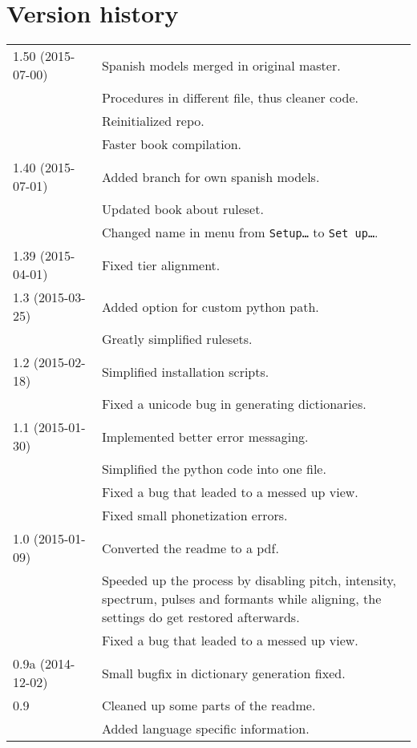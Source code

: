 \section{Version history}
\begin{longtable}{|p{0.22\linewidth}p{0.8\linewidth}|}
	\hline
	1.50 (2015-07-00) & \tabitem Spanish models merged in original master.\\
		& \tabitem Procedures in different file, thus cleaner code.\\
		& \tabitem Reinitialized repo.\\
		& \tabitem Faster book compilation.\\
	\hline
	1.40 (2015-07-01) & \tabitem  Added branch for own spanish models.\\
		& \tabitem Updated book about ruleset.\\
		& \tabitem Changed name in menu from \texttt{Setup\ldots} to 
			\texttt{Set up\dots}.\\
	\hline
	1.39 (2015-04-01) & \tabitem Fixed tier alignment.\\
	\hline
	1.3 (2015-03-25) & \tabitem Added option for custom python path.\\
	 & \tabitem Greatly simplified rulesets.\\
	\hline
	1.2 (2015-02-18) & \tabitem Simplified installation scripts.\\
		& \tabitem Fixed a unicode bug in generating dictionaries.\\
	\hline
	1.1 (2015-01-30) & \tabitem Implemented better error messaging.\\
		& \tabitem Simplified the python code into one file.\\
		& \tabitem Fixed a bug that leaded to a messed up view.\\
		& \tabitem Fixed small phonetization errors.\\
	\hline
	1.0 (2015-01-09) & \tabitem Converted the readme to a pdf.\\
		& \tabitem Speeded up the process by disabling pitch, intensity,
spectrum, pulses and formants while aligning, the settings do get restored
afterwards.\\
		& \tabitem Fixed a bug that leaded to a messed up view.\\
	\hline
	0.9a (2014-12-02) & \tabitem Small bugfix in dictionary generation fixed.\\
	\hline
	0.9 & \tabitem Cleaned up some parts of the readme.\\
		& \tabitem Added language specific information.\\

\end{longtable}
